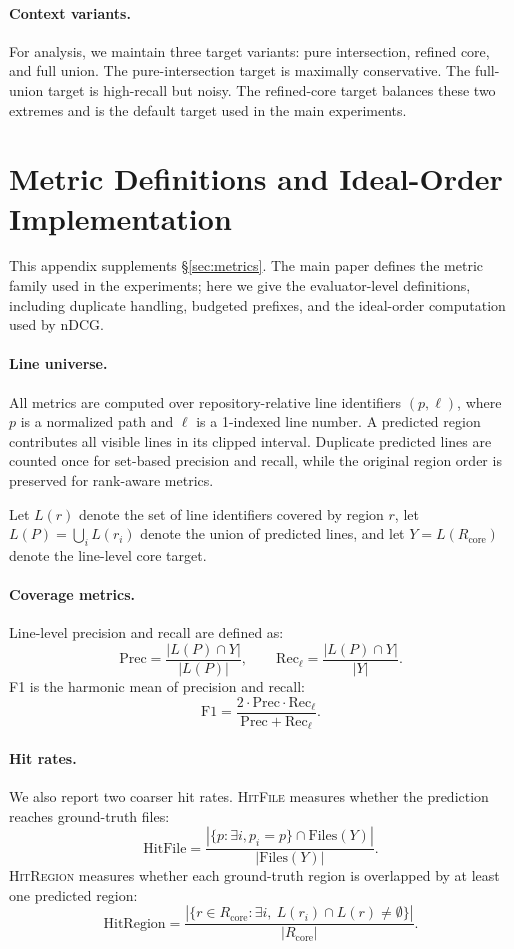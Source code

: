 \documentclass{llmxive}
\begin{document}
\paragraph{Context variants.}
For analysis, we maintain three target variants: pure intersection, refined core,
and full union. The pure-intersection target is maximally conservative. The
full-union target is high-recall but noisy. The refined-core target balances
these two extremes and is the default target used in the main experiments.


\section{Metric Definitions and Ideal-Order Implementation}
\label{app:metrics}

This appendix supplements \S\ref{sec:metrics}. The main paper defines the metric
family used in the experiments; here we give the evaluator-level definitions,
including duplicate handling, budgeted prefixes, and the ideal-order computation
used by nDCG.

\paragraph{Line universe.}
All metrics are computed over repository-relative line identifiers $(p,\ell)$,
where $p$ is a normalized path and $\ell$ is a 1-indexed line number. A predicted
region contributes all visible lines in its clipped interval. Duplicate
predicted lines are counted once for set-based precision and recall, while the
original region order is preserved for rank-aware metrics.

Let $L(r)$ denote the set of line identifiers covered by region $r$, let
$L(P)=\bigcup_i L(r_i)$ denote the union of predicted lines, and let
$Y=L(R_{\mathrm{core}})$ denote the line-level core target.

\paragraph{Coverage metrics.}
Line-level precision and recall are defined as:
\[
\mathrm{Prec}
=
\frac{|L(P)\cap Y|}{|L(P)|},
\qquad
\mathrm{Rec}_{\ell}
=
\frac{|L(P)\cap Y|}{|Y|}.
\]
F1 is the harmonic mean of precision and recall:
\[
\mathrm{F1}
=
\frac{2\cdot \mathrm{Prec}\cdot \mathrm{Rec}_{\ell}}
{\mathrm{Prec}+\mathrm{Rec}_{\ell}}.
\]

\paragraph{Hit rates.}
We also report two coarser hit rates. \textsc{HitFile} measures whether the
prediction reaches ground-truth files:
\[
\mathrm{HitFile}
=
\frac{
|\{p:\exists i, p_i=p\}\cap \mathrm{Files}(Y)|
}{
|\mathrm{Files}(Y)|
}.
\]
\textsc{HitRegion} measures whether each ground-truth region is overlapped by
at least one predicted region:
\[
\mathrm{HitRegion}
=
\frac{
|\{r\in R_{\mathrm{core}}:\exists i,\ L(r_i)\cap L(r)\neq \emptyset\}|
}{
|R_{\mathrm{core}}|
}.
\]
\end{document}
